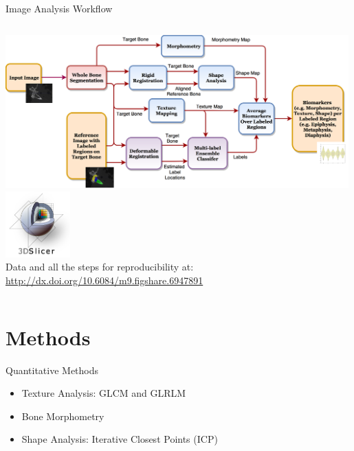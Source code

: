 \documentclass[10pt,aspectratio=169]{beamer}
\begin{document}
{
\begin{frame}{Image Analysis Workflow}
\begin{columns}[onlytextwidth]
      \includegraphics[width=0.99\textwidth]{figures/Automated_Processing_Pipeline.png}
        \centering
        \includegraphics[width=2.5cm]{logos/logo_slicer.png}\\
        \vspace{0.3cm}
        Data and all the steps for reproducibility at: \url{http://dx.doi.org/10.6084/m9.figshare.6947891}
\end{columns}
\end{frame}
}

\section{Methods}

\begin{frame}[fragile]{Quantitative Methods}
  \begin{itemize} \itemsep2em
    \item Texture Analysis: GLCM and GLRLM

    \item Bone Morphometry

    \item Shape Analysis: Iterative Closest Points (ICP)
  \end{itemize}
\end{frame}
\end{document}
